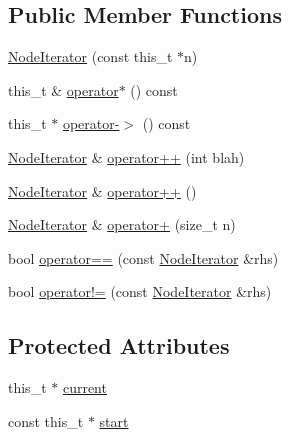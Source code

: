 \subsection*{Public Member Functions}
\begin{DoxyCompactItemize}
\item 
\hyperlink{class_base_node_1_1_node_iterator_a9414dbb668b4b98f5377d434f8577dc6}{Node\+Iterator} (const this\+\_\+t $\ast$n)
\item 
this\+\_\+t \& \hyperlink{class_base_node_1_1_node_iterator_ae8543e096a3169c59238cb4a2d872d88}{operator$\ast$} () const
\item 
this\+\_\+t $\ast$ \hyperlink{class_base_node_1_1_node_iterator_a6d9525f787b4339909c6236b93905ec2}{operator-\/$>$} () const
\item 
\hyperlink{class_base_node_1_1_node_iterator}{Node\+Iterator} \& \hyperlink{class_base_node_1_1_node_iterator_a951d2910a7c8246bf882cd684ac12f64}{operator++} (int blah)
\item 
\hyperlink{class_base_node_1_1_node_iterator}{Node\+Iterator} \& \hyperlink{class_base_node_1_1_node_iterator_a5fd7a29fd07fdc3e60302bdc8a6cb61f}{operator++} ()
\item 
\hyperlink{class_base_node_1_1_node_iterator}{Node\+Iterator} \& \hyperlink{class_base_node_1_1_node_iterator_a347656df237dcc3de8ad40896b260cf8}{operator+} (size\+\_\+t n)
\item 
bool \hyperlink{class_base_node_1_1_node_iterator_af3e1ab104af103b5536e4b9237fba588}{operator==} (const \hyperlink{class_base_node_1_1_node_iterator}{Node\+Iterator} \&rhs)
\item 
bool \hyperlink{class_base_node_1_1_node_iterator_a10e2c9cd9a879e6a5779981badfa335b}{operator!=} (const \hyperlink{class_base_node_1_1_node_iterator}{Node\+Iterator} \&rhs)
\end{DoxyCompactItemize}
\subsection*{Protected Attributes}
\begin{DoxyCompactItemize}
\item 
this\+\_\+t $\ast$ \hyperlink{class_base_node_1_1_node_iterator_a64b6d98532282b0d5c4b00454f2dd9cb}{current}
\item 
const this\+\_\+t $\ast$ \hyperlink{class_base_node_1_1_node_iterator_a0583943df31aaf646c09338a1ba866c1}{start}
\end{DoxyCompactItemize}


